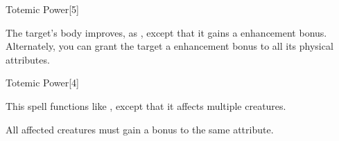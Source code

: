 \begin{spellsection}[Greater]{Totemic Power}[5]
    \begin{spellheader}
    \end{spellheader}
    \begin{spellcontent}
        \begin{spelltargetinginfo}
        \end{spelltargetinginfo}
        \begin{spelleffects}
            \spelleffect The target's body improves, as , except that it gains a  enhancement bonus. Alternately, you can grant the target a  enhancement bonus to all its physical attributes.
            \spelldur \durpersonallong
        \end{spelleffects}
    \end{spellcontent}
    \begin{spellfooter}
    \end{spellfooter}
\end{spellsection}

\begin{spellsection}[Mass]{Totemic Power}[4]
    \begin{spellheader}
    \end{spellheader}
    \begin{spellcontent}
        \begin{spelltargetinginfo}
        \end{spelltargetinginfo}
        \begin{spelleffects}
            \spellspecial This spell functions like , except that it affects multiple creatures.
            \spelldur \durshort
        \end{spelleffects}
    \end{spellcontent}
    \begin{spellfooter}
        \spellnotes All affected creatures must gain a bonus to the same attribute.
    \end{spellfooter}
\end{spellsection}

